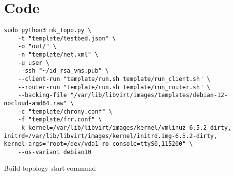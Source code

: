\chapter{Code} %
\label{chap:Code}

\begin{listing}
\begin{verbatim}
sudo python3 mk_topo.py \
    -t "template/testbed.json" \
    -o "out/" \
    -n "template/net.xml" \
    -u user \
    --ssh "~/id_rsa_vms.pub" \
    --client-run "template/run.sh template/run_client.sh" \
    --router-run "template/run.sh template/run_router.sh" \
    --backing-file "/var/lib/libvirt/images/templates/debian-12-nocloud-amd64.raw" \
    -c "template/chrony.conf" \
    -f "template/frr.conf" \
    -k kernel=/var/lib/libvirt/images/kernel/vmlinuz-6.5.2-dirty, initrd=/var/lib/libvirt/images/kernel/initrd.img-6.5.2-dirty, kernel_args="root=/dev/vda1 ro console=ttyS0,115200" \
    --os-variant debian10
\end{verbatim}
\caption{Build topology start command}
\label{lst:cmd_mk_topo_start}
\end{listing}

